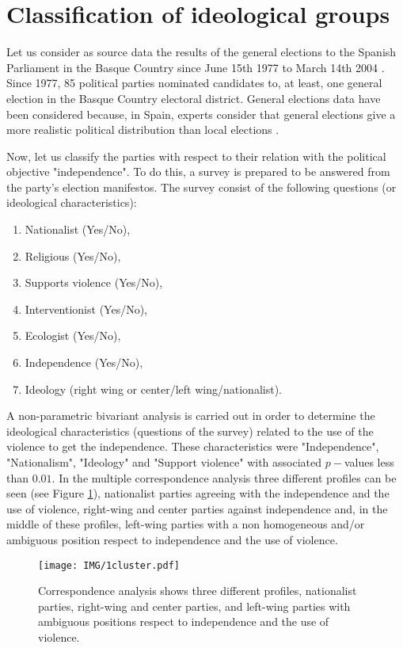\section{Classification of ideological groups}\label{1.1}

Let us consider as source data the results of the general elections to the Spanish
Parliament in the Basque Country since June 15th 1977 to March 14th 2004 
\cite{mir}. Since 1977, 85 political parties nominated candidates to,
at least, one general election in the Basque Country electoral district.
General elections data have been considered because, in Spain, experts
consider that general elections give a more realistic political distribution
than local elections \cite{elecGen}.

Now, let us classify the parties with respect to their relation with the
political objective "independence". To do this, a survey is prepared to be
answered from the party's election manifestos. The survey consist of the following
questions (or ideological characteristics):

\begin{enumerate}
\item Nationalist (Yes/No),
\item Religious (Yes/No),
\item Supports violence (Yes/No),
\item Interventionist (Yes/No),
\item Ecologist (Yes/No),
\item Independence (Yes/No),
\item Ideology (right wing or center/left wing/nationalist).
\end{enumerate}

A non-parametric bivariant analysis \cite[Chap. 9]{Groot} is carried out
in order to determine the ideological characteristics (questions of the survey)
related to the use of the violence to get the independence.
These characteristics were "Independence", "Nationalism", "Ideology" and "Support violence"
with associated $p-$values less than $0.01$. In the multiple correspondence
analysis \cite[Chap. 10]{Hair} three different profiles can be seen (see
Figure \ref{1cluster}), nationalist parties agreeing with the independence and
the use of violence, right-wing and center parties against independence
and, in the middle of these profiles, left-wing parties with a non
homogeneous and/or ambiguous position respect to independence and the
use of violence.

\begin{figure}[htb]
\begin{center}
\texttt{[image: IMG/1cluster.pdf]}
\end{center}
\caption{Correspondence analysis shows three different profiles, nationalist 
parties, right-wing and center parties, and left-wing parties with ambiguous 
positions respect to independence and the use of violence.}
\label{1cluster}
\end{figure}

